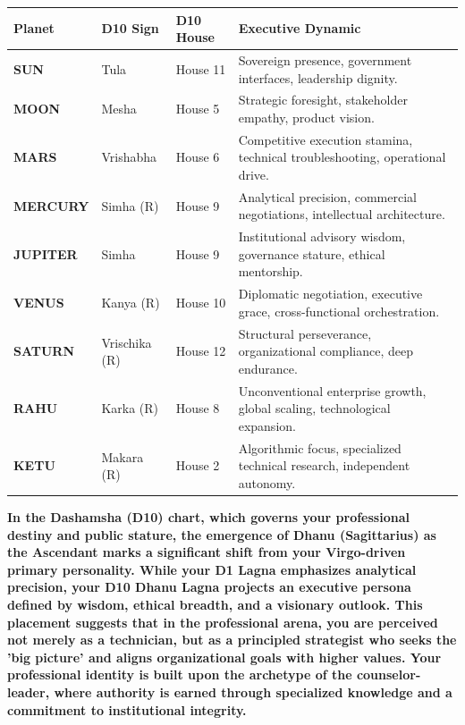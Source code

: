 \begin{executivecard}
  \sffamily\fontsize{8}{11.5}\selectfont
  \begin{tabularx}{\linewidth}{@{}l l l X@{}}
    \toprule
    \textbf{Planet} & \textbf{D10 Sign} & \textbf{D10 House} & \textbf{Executive Dynamic} \\
    \midrule
    \textbf{SUN} & Tula & House 11 & Sovereign presence, government interfaces, leadership dignity. \\
    \textbf{MOON} & Mesha & House 5 & Strategic foresight, stakeholder empathy, product vision. \\
    \textbf{MARS} & Vrishabha & House 6 & Competitive execution stamina, technical troubleshooting, operational drive. \\
    \textbf{MERCURY} & Simha (R) & House 9 & Analytical precision, commercial negotiations, intellectual architecture. \\
    \textbf{JUPITER} & Simha & House 9 & Institutional advisory wisdom, governance stature, ethical mentorship. \\
    \textbf{VENUS} & Kanya (R) & House 10 & Diplomatic negotiation, executive grace, cross-functional orchestration. \\
    \textbf{SATURN} & Vrischika (R) & House 12 & Structural perseverance, organizational compliance, deep endurance. \\
    \textbf{RAHU} & Karka (R) & House 8 & Unconventional enterprise growth, global scaling, technological expansion. \\
    \textbf{KETU} & Makara (R) & House 2 & Algorithmic focus, specialized technical research, independent autonomy. \\
    \bottomrule
  \end{tabularx}
\end{executivecard}\vspace{2mm}

\label{topic26}

{\fontsize{9.5}{13.8}\selectfont\bfseries\color{DeepSlate} In the Dashamsha (D10) chart, which governs your professional destiny and public stature, the emergence of Dhanu (Sagittarius) as the Ascendant marks a significant shift from your Virgo-driven primary personality. While your D1 Lagna emphasizes analytical precision, your D10 Dhanu Lagna projects an executive persona defined by wisdom, ethical breadth, and a visionary outlook. This placement suggests that in the professional arena, you are perceived not merely as a technician, but as a principled strategist who seeks the 'big picture' and aligns organizational goals with higher values. Your professional identity is built upon the archetype of the counselor-leader, where authority is earned through specialized knowledge and a commitment to institutional integrity.}\par\vspace{2mm}

